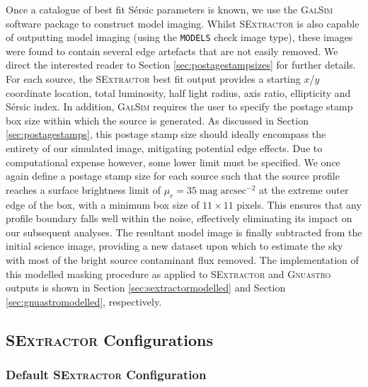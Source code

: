 \documentclass[fleqn,usenatbib,useAMS]{mnras}
\newcommand*{\Sersic}{S\'{e}rsic\xspace}
\newcommand*{\SExtractor}{\textsc{SExtractor}\xspace}
\newcommand*{\Gnuastro}{\textsc{Gnuastro}\xspace}
\newcommand*{\GalSim}{\textsc{GalSim}\xspace}
\begin{document}
Once a catalogue of best fit \Sersic parameters is known, we use the \GalSim software package to construct model imaging. Whilst \SExtractor is also capable of outputting model imaging (using the \texttt{MODELS} check image type), these images were found to contain several edge artefacts that are not easily removed. We direct the interested reader to Section \ref{sec:postagestampsizes} for further details. For each source, the \SExtractor best fit output provides a starting $x$/$y$ coordinate location, total luminosity, half light radius, axis ratio, ellipticity and \Sersic index. In addition, \GalSim requires the user to specify the postage stamp box size within which the source is generated. As discussed in Section \ref{sec:postagestamps}, this postage stamp size should ideally encompass the entirety of our simulated image, mitigating potential edge effects. Due to computational expense however, some lower limit must be specified. We once again define a postage stamp size for each source such that the source profile reaches a surface brightness limit of $\mu_r=35\;\mathrm{mag\;arcsec}^{-2}$ at the extreme outer edge of the box, with a minimum box size of $11\times11$ pixels. This ensures that any profile boundary falls well within the noise, effectively eliminating its impact on our subsequent analyses. The resultant model image is finally subtracted from the initial science image, providing a new dataset upon which to estimate the sky with most of the bright source contaminant flux removed. The implementation of this modelled masking procedure as applied to \SExtractor and \Gnuastro outputs is shown in Section \ref{sec:sextractormodelled} and Section \ref{sec:gnuastromodelled}, respectively. 

\subsection{\SExtractor Configurations}
\label{sec:sextractor}

\subsubsection{Default \SExtractor Configuration}
\label{sec:sextractordefault}
\end{document}
